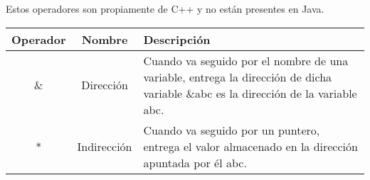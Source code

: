 Estos operadores son propiamente de C++ y no están presentes en Java. 

\begin{tabular}{|c|c|p{11cm}|}
	\hline
	\textbf{Operador}	& \textbf{Nombre} & \textbf{Descripción}  \\
	\hline
	\& & Dirección & Cuando va seguido por el nombre de una variable, entrega la
	dirección de dicha variable \&abc es la dirección de la variable
	abc. \\
	\hline
	* & Indirección & Cuando va seguido por un puntero, entrega el valor almacenado
	en la dirección apuntada por él
	abc. \\
	\hline
	
\end{tabular}